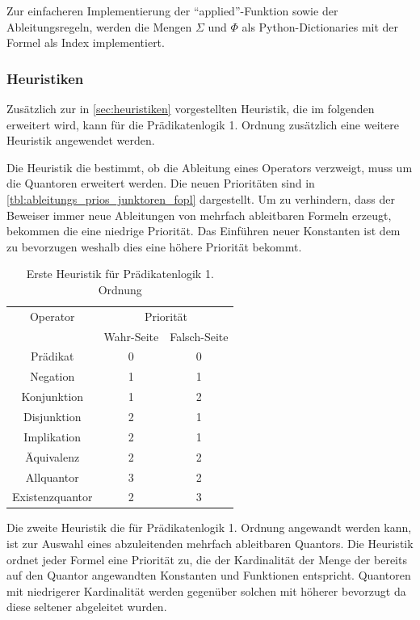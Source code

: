 Zur einfacheren Implementierung der ``applied''-Funktion sowie der Ableitungsregeln, werden die Mengen $\Sigma$ und $\Phi$ als Python-Dictionaries mit der Formel als Index implementiert.

\subsubsection{Heuristiken}
Zusätzlich zur in \autoref{sec:heuristiken} vorgestellten Heuristik, die im folgenden erweitert wird, kann für die Prädikatenlogik 1. Ordnung zusätzlich eine weitere Heuristik angewendet werden.

Die Heuristik die bestimmt, ob die Ableitung eines Operators verzweigt, muss um die Quantoren erweitert werden. Die neuen Prioritäten sind in \autoref{tbl:ableitungs_prios_junktoren_fopl} dargestellt. Um zu verhindern, dass der Beweiser immer neue Ableitungen von mehrfach ableitbaren Formeln erzeugt, bekommen die eine niedrige Priorität. Das Einführen neuer Konstanten ist dem zu bevorzugen weshalb dies eine höhere Priorität bekommt.

\begin{table}[h]
\begin{center}
\begin{tabular}{|c|c|c|}
\hline
Operator & \multicolumn{2}{c|}{Priorität} \\
\cline{2-3}
 & Wahr-Seite & Falsch-Seite \\
\hline
Prädikat & 0 & 0 \\
Negation & 1 & 1 \\
Konjunktion & 1 & 2 \\
Disjunktion & 2 & 1 \\
Implikation & 2 & 1 \\
Äquivalenz & 2 & 2 \\
Allquantor & 3 & 2 \\
Existenzquantor & 2 & 3 \\
\hline
\end{tabular}
\end{center}
\caption{\label{tbl:ableitungs_prios_junktoren_fopl}Erste Heuristik für Prädikatenlogik 1. Ordnung}
\end{table}

Die zweite Heuristik die für Prädikatenlogik 1. Ordnung angewandt werden kann, ist zur Auswahl eines abzuleitenden mehrfach ableitbaren Quantors. Die Heuristik ordnet jeder Formel eine Priorität zu, die der Kardinalität der Menge der bereits auf den Quantor angewandten Konstanten und Funktionen entspricht. Quantoren mit niedrigerer Kardinalität werden gegenüber solchen mit höherer bevorzugt da diese seltener abgeleitet wurden.


